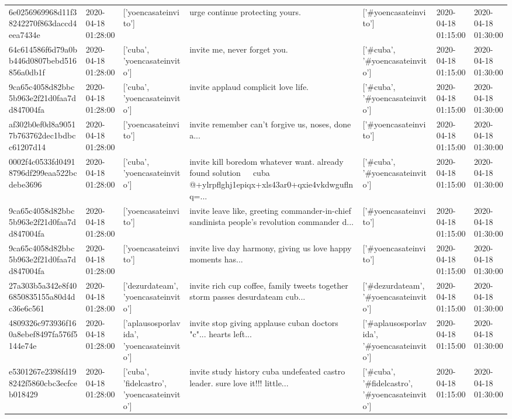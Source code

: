 \begin{tabular}{lllllll}
6e0256969968d11f38242270f863daccd4eea7434e & 2020-04-18 01:28:00 & ['yoencasateinvito'] & urge continue protecting yours. & ['#yoencasateinvito'] & 2020-04-18 01:15:00 & 2020-04-18 01:30:00 \\
64c614586f6d79a0bb446d0807bebd516856a0db1f & 2020-04-18 01:28:00 & ['cuba', 'yoencasateinvito'] & invite me, never forget you. & ['#cuba', '#yoencasateinvito'] & 2020-04-18 01:15:00 & 2020-04-18 01:30:00 \\
9ca65c4058d82bbc5b963e2f21d0faa7dd847004fa & 2020-04-18 01:28:00 & ['cuba', 'yoencasateinvito'] & invite applaud complicit love life. & ['#cuba', '#yoencasateinvito'] & 2020-04-18 01:15:00 & 2020-04-18 01:30:00 \\
af302b0ef0d8a90517b763762dec1bdbcc61207d14 & 2020-04-18 01:28:00 & ['yoencasateinvito'] & invite remember can't forgive us, noses, done a... & ['#yoencasateinvito'] & 2020-04-18 01:15:00 & 2020-04-18 01:30:00 \\
0002f4c0533fd04918796df299eaa522bcdebe3696 & 2020-04-18 01:28:00 & ['cuba', 'yoencasateinvito'] & invite kill boredom whatever want. already found solution 🤣🤣🤣 cuba @+ylrpflghj1epiqx+xls43ar0+qxie4vkdwguflnq=... & ['#cuba', '#yoencasateinvito'] & 2020-04-18 01:15:00 & 2020-04-18 01:30:00 \\
9ca65c4058d82bbc5b963e2f21d0faa7dd847004fa & 2020-04-18 01:28:00 & ['yoencasateinvito'] & invite leave like, greeting commander-in-chief sandinista people's revolution commander d... & ['#yoencasateinvito'] & 2020-04-18 01:15:00 & 2020-04-18 01:30:00 \\
9ca65c4058d82bbc5b963e2f21d0faa7dd847004fa & 2020-04-18 01:28:00 & ['yoencasateinvito'] & invite live day harmony, giving us love happy moments has... & ['#yoencasateinvito'] & 2020-04-18 01:15:00 & 2020-04-18 01:30:00 \\
27a303b5a342e8f406850835155a80d4dc36e6c561 & 2020-04-18 01:28:00 & ['dezurdateam', 'yoencasateinvito'] & invite rich cup coffee, family tweets together storm passes desurdateam cub... & ['#dezurdateam', '#yoencasateinvito'] & 2020-04-18 01:15:00 & 2020-04-18 01:30:00 \\
4809326c973936f160a8ebef8497fa576f5144e74e & 2020-04-18 01:28:00 & ['aplausosporlavida', 'yoencasateinvito'] & invite stop giving applause cuban doctors "c"... hearts left... & ['#aplausosporlavida', '#yoencasateinvito'] & 2020-04-18 01:15:00 & 2020-04-18 01:30:00 \\
e5301267e2398fd198242f5860cbc3ecfceb018429 & 2020-04-18 01:28:00 & ['cuba', 'fidelcastro', 'yoencasateinvito'] & invite study history cuba undefeated castro leader. sure love it!!! little... & ['#cuba', '#fidelcastro', '#yoencasateinvito'] & 2020-04-18 01:15:00 & 2020-04-18 01:30:00 \\

\end{tabular}
